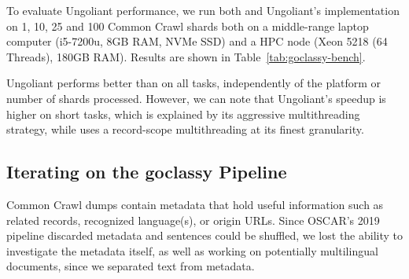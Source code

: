 To evaluate Ungoliant performance, we run both \goclassy and Ungoliant's implementation on 1, 10, 25 and 100 Common Crawl shards both on a middle-range laptop computer (i5-7200u, 8GB RAM, NVMe SSD) and a HPC node (Xeon 5218 (64 Threads), 180GB RAM). Results are shown in Table~\ref{tab:goclassy-bench}.

\begin{table}[t]
    \centering\small
    \caption{Comparison of approximate generation times depending on platform and number of shards.}
    \label{tab:goclassy-bench}
\end{table}

Ungoliant performs better than \goclassy on all tasks, independently of the platform or number of shards processed. However, we can note that Ungoliant's speedup is higher on short tasks, which is explained by its aggressive multithreading strategy, while \goclassy uses a record-scope multithreading at its finest granularity.


\subsection{Iterating on the goclassy Pipeline}


Common Crawl dumps contain metadata that hold useful information such as related records, recognized language(s), or origin URLs. Since OSCAR's 2019 pipeline discarded metadata and sentences could be shuffled, we lost the ability to investigate the metadata itself, as well as working on potentially multilingual documents, since we separated text from metadata.

